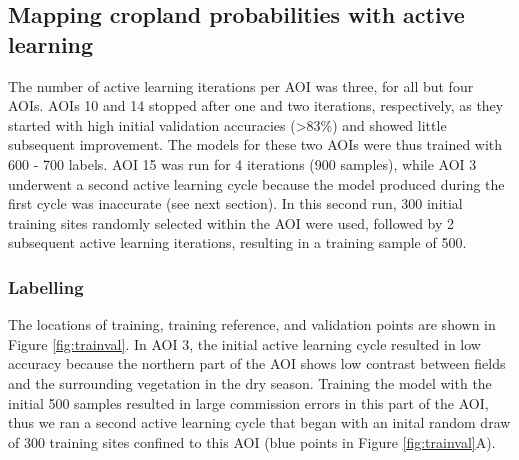 \documentclass[
  11pt,
  a4paper]{article}
\begin{document}
\hypertarget{mapping-cropland-probabilities-with-active-learning}{%
\subsection{Mapping cropland probabilities with active
learning}\label{mapping-cropland-probabilities-with-active-learning}}

The number of active learning iterations per AOI was three, for all but
four AOIs. AOIs 10 and 14 stopped after one and two iterations,
respectively, as they started with high initial validation accuracies
(\textgreater83\%) and showed little subsequent improvement. The models
for these two AOIs were thus trained with 600 - 700 labels. AOI 15 was
run for 4 iterations (900 samples), while AOI 3 underwent a second
active learning cycle because the model produced during the first cycle
was inaccurate (see next section). In this second run, 300 initial
training sites randomly selected within the AOI were used, followed by 2
subsequent active learning iterations, resulting in a training sample of
500.

\hypertarget{labelling}{%
\subsubsection{Labelling}\label{labelling}}

The locations of training, training reference, and validation points are
shown in Figure \ref{fig:trainval}. In AOI 3, the initial active
learning cycle resulted in low accuracy because the northern part of the
AOI shows low contrast between fields and the surrounding vegetation in
the dry season. Training the model with the initial 500 samples resulted
in large commission errors in this part of the AOI, thus we ran a second
active learning cycle that began with an inital random draw of 300
training sites confined to this AOI (blue points in Figure
\ref{fig:trainval}A).
\end{document}
